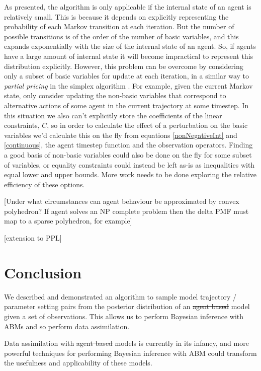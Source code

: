 \documentclass{article}
\providecommand{\DIFaddtex}[1]{{\protect\color{blue}\uwave{#1}}} %
\providecommand{\DIFdeltex}[1]{{\protect\color{red}\sout{#1}}}                      %
\providecommand{\DIFaddbegin}{} %
\providecommand{\DIFaddend}{} %
\providecommand{\DIFdelbegin}{} %
\providecommand{\DIFdelend}{} %
\providecommand{\DIFadd}[1]{\texorpdfstring{\DIFaddtex{#1}}{#1}} %
\providecommand{\DIFdel}[1]{\texorpdfstring{\DIFdeltex{#1}}{}} %
\newcommand{\DIFscaledelfig}{0.5}
\newlength{\DIFdelgraphicswidth} %
\newlength{\DIFdelgraphicsheight} %
\newcommand{\DIFaddincludegraphics}[2][]{{\color{blue}\fbox{\DIFOincludegraphics[#1]{#2}}}} %
\newcommand{\DIFdelincludegraphics}[2][]{%
\sbox{\DIFdelgraphicsbox}{\DIFOincludegraphics[#1]{#2}}%
\settoboxwidth{\DIFdelgraphicswidth}{\DIFdelgraphicsbox} %
\settoboxtotalheight{\DIFdelgraphicsheight}{\DIFdelgraphicsbox} %
\scalebox{\DIFscaledelfig}{%
\parbox[b]{\DIFdelgraphicswidth}{\usebox{\DIFdelgraphicsbox}\\[-\baselineskip] \rule{\DIFdelgraphicswidth}{0em}}\llap{\resizebox{\DIFdelgraphicswidth}{\DIFdelgraphicsheight}{%
\setlength{\unitlength}{\DIFdelgraphicswidth}%
\begin{picture}(1,1)%
\thicklines\linethickness{2pt} %
{\color[rgb]{1,0,0}\put(0,0){\framebox(1,1){}}}%
{\color[rgb]{1,0,0}\put(0,0){\line( 1,1){1}}}%
{\color[rgb]{1,0,0}\put(0,1){\line(1,-1){1}}}%
\end{picture}%
}\hspace*{3pt}}} %
} %
\DeclareRobustCommand{\DIFaddbegin}{\DIFOaddbegin \let\includegraphics\DIFaddincludegraphics} %
\DeclareRobustCommand{\DIFaddend}{\DIFOaddend \let\includegraphics\DIFOincludegraphics} %
\DeclareRobustCommand{\DIFdelbegin}{\DIFOdelbegin \let\includegraphics\DIFdelincludegraphics} %
\DeclareRobustCommand{\DIFdelend}{\DIFOaddend \let\includegraphics\DIFOincludegraphics} %
\begin{document}
As presented, the algorithm is only applicable if the internal state of an agent is relatively small. This is because it depends on explicitly representing the probability of each Markov transition at each iteration. But the number of possible transitions is of the order of the number of basic variables, and this expands exponentially with the size of the internal state of an agent. So, if agents have a large amount of internal state it will become impractical to represent this distribution explicitly. However, this problem can be overcome by considering only a subset of basic variables for update at each iteration, in a similar way to \textit{partial pricing} in the simplex algorithm \citep{maros2002computational}. For example, given the current Markov state, only consider updating the non-basic variables that correspond to alternative actions of some agent in the current trajectory at some timestep. In this situation we also can't explicitly store the coefficients of the linear constraints, $C$, so in order to calculate the effect of a perturbation on the basic variables we'd calculate this on the fly from equations \eqref{nonNegativeInt} and \eqref{continuous}, the agent timestep function and the observation operators. Finding a good basis of non-basic variables could also be done on the fly for some subset of variables, or equality constraints could instead be left as-is as inequalities with equal lower and upper bounds. More work needs to be done exploring the relative efficiency of these options.

[Under what circumstances can agent behaviour be approximated by convex polyhedron? If agent solves an NP complete problem then the delta PMF must map to a sparse polyhedron, for example]

[extension to PPL]

\section{Conclusion}\DIFaddbegin \label{sec:conclusion}
\DIFaddend 

We described and demonstrated an algorithm to sample model trajectory / parameter setting pairs from the posterior distribution of an \DIFdelbegin \DIFdel{agent based }\DIFdelend \DIFaddbegin \DIFadd{agent-based }\DIFaddend model given a set of observations. This allows us to  perform Bayesian inference with ABMs and so perform data assimilation.

Data assimilation with \DIFdelbegin \DIFdel{agent based }\DIFdelend \DIFaddbegin \DIFadd{agent-based }\DIFaddend models is currently in its infancy, and more powerful techniques for performing Bayesian inference with ABM could transform the usefulness and applicability of these models.
\DIFaddbegin 
\end{document}
